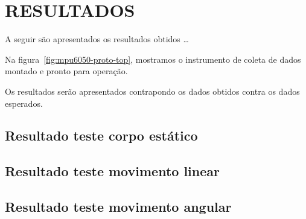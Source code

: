 \chapter{RESULTADOS}\label{chap:resuldatos}

A seguir são apresentados os resultados obtidos \ldots

Na figura~\ref{fig:mpu6050-proto-top}, mostramos o instrumento de coleta de dados montado e pronto para operação.

Os resultados serão apresentados contrapondo os dados obtidos contra os dados esperados.

\section{Resultado teste corpo estático}
\section{Resultado teste movimento linear}
\section{Resultado teste movimento angular}

